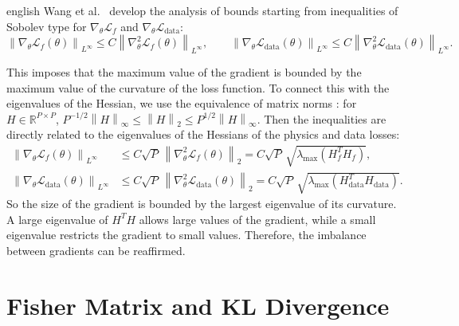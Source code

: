 \documentclass[11pt,letterpaper,twoside,openright]{book} %
\newcommand{\norm}[1]{\left\lVert #1 \right\rVert}
\newcommand{\Loss}{\mathcal{L}}
\newif\ifreviewmode
\newcommand{\revtag}[2]{\ifreviewmode{\color{red!70!black}\textsf{\footnotesize[#1#2]}}\fi}
\newcommand{\verificar}[1]{\revtag{VERIFICAR}{: #1}}
\begin{document}
\begin{hyphenrules}{english}
Wang et al.~\cite{wang2021gradient} develop the analysis of bounds starting from inequalities of Sobolev type
for $\nabla_\theta\Loss_f$ and $\nabla_\theta\Loss_{\mathrm{data}}$:
\begin{equation}
  \norm{\nabla_\theta\Loss_f(\theta)}_{L^\infty}\le C\norm{\nabla^2_\theta\Loss_f(\theta)}_{L^\infty},\qquad
  \norm{\nabla_\theta\Loss_{\mathrm{data}}(\theta)}_{L^\infty}\le C\norm{\nabla^2_\theta\Loss_{\mathrm{data}}(\theta)}_{L^\infty}.
  \label{eq:grad-bounds}
\end{equation}
\verificar{exact form and hypotheses of these inequalities in Wang et al.\ (2021)}
This imposes that the maximum value of the gradient is bounded by the maximum value of the curvature of
the loss function. To connect this with the eigenvalues of the Hessian, we use the equivalence of matrix
norms \cite{trefethen1997}: for $H\in\mathbb{R}^{P\times P}$,
$P^{-1/2}\norm{H}_\infty\le\norm{H}_2\le P^{1/2}\norm{H}_\infty$. Then the inequalities are directly related
to the eigenvalues of the Hessians of the physics and data losses:
\begin{align}
  \norm{\nabla_\theta\Loss_f(\theta)}_{L^\infty}&\le C\sqrt{P}\,\norm{\nabla^2_\theta\Loss_f(\theta)}_{2}
  =C\sqrt{P}\,\sqrt{\lambda_{\max}(H_f^{T}H_f)}, \label{eq:bound-f}\\
  \norm{\nabla_\theta\Loss_{\mathrm{data}}(\theta)}_{L^\infty}&\le C\sqrt{P}\,\norm{\nabla^2_\theta\Loss_{\mathrm{data}}(\theta)}_{2}
  =C\sqrt{P}\,\sqrt{\lambda_{\max}(H_{\mathrm{data}}^{T}H_{\mathrm{data}})}. \label{eq:bound-data}
\end{align}
So the size of the gradient is bounded by the largest eigenvalue of its curvature. A large eigenvalue of
$H^{T}H$ allows large values of the gradient, while a small eigenvalue restricts the gradient to small
values. Therefore, the imbalance between gradients can be reaffirmed.


\section{Fisher Matrix and KL Divergence}\label{app:fisher}


\end{hyphenrules}
\end{document}

